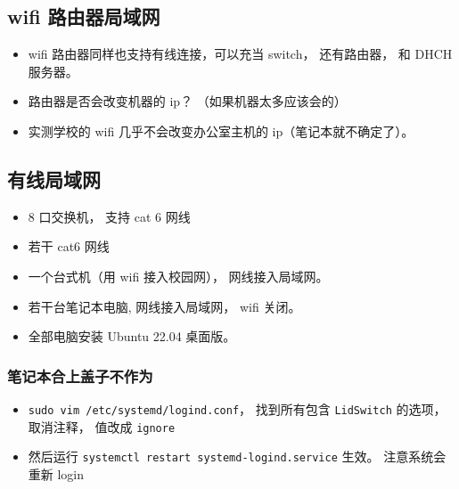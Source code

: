 
\begin{issues}
\issueDraft
\end{issues}


\subsection{wifi 路由器局域网}
\begin{itemize}
\item wifi 路由器同样也支持有线连接，可以充当 switch， 还有路由器， 和 DHCH 服务器。
\item 路由器是否会改变机器的 ip？ （如果机器太多应该会的）
\item 实测学校的 wifi 几乎不会改变办公室主机的 ip（笔记本就不确定了）。
\end{itemize}

\subsection{有线局域网}
\begin{itemize}
\item 8 口交换机， 支持 cat 6 网线
\item 若干 cat6 网线
\item 一个台式机（用 wifi 接入校园网）， 网线接入局域网。
\item 若干台笔记本电脑, 网线接入局域网， wifi 关闭。
\item 全部电脑安装 Ubuntu 22.04 桌面版。
\end{itemize}

\subsubsection{笔记本合上盖子不作为}
\begin{itemize}
\item \verb|sudo vim /etc/systemd/logind.conf|， 找到所有包含 \verb|LidSwitch| 的选项， 取消注释， 值改成 \verb|ignore|
\item 然后运行 \verb|systemctl restart systemd-logind.service| 生效。 注意系统会重新 login
\end{itemize}


